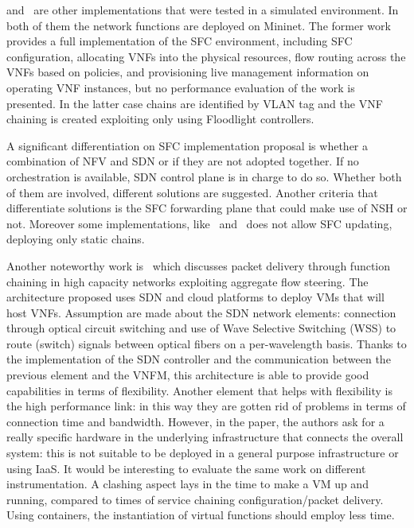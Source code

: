 \cite{csoma2014escape} and~\cite{kim2016evaluations} are other implementations
that were tested in a simulated environment. In both of them the
network functions are deployed on Mininet. The former work provides a full
implementation of the SFC environment, including SFC configuration, allocating
VNFs into the physical resources, flow routing across the VNFs based on
policies, and provisioning live management information on operating VNF
instances, but no performance evaluation of the work is presented. In the latter
case chains are identified by VLAN tag and the VNF chaining is created
exploiting only using Floodlight controllers.

A significant differentiation on SFC implementation proposal is whether a
combination of NFV and SDN or if they are not adopted together. If no
orchestration is available, SDN control plane is in charge to do so. Whether
both of them are involved, different solutions are suggested. Another criteria
that differentiate solutions is the SFC forwarding plane that could make use of
NSH or not. Moreover some implementations, like~\cite{soares2015toward}
and~\cite{abujoda2015midas} does not allow SFC updating, deploying only static
chains.

Another noteworthy work is~\cite{xia2015optical} which discusses packet
delivery through function chaining in high capacity networks exploiting
aggregate flow steering. The architecture proposed uses SDN and cloud
platforms to deploy VMs that will host VNFs. Assumption are made about the SDN
network elements: connection through optical circuit switching and use of Wave
Selective Switching (WSS) to route (switch) signals between optical fibers on a
per-wavelength basis. Thanks to the implementation of the SDN controller and the
communication between the previous element and the VNFM, this architecture is
able to provide good capabilities in terms of flexibility. Another element that
helps with flexibility is the high performance link: in this way they are gotten
rid of problems in terms of connection time and bandwidth. However, in the
paper, the  authors ask for a really specific hardware in the underlying
infrastructure that connects the overall system: this is not suitable to be
deployed in a general purpose infrastructure or using IaaS. It would be
interesting to evaluate the same work on different instrumentation. A clashing
aspect lays in the time to make a VM up and running, compared to times of
service chaining configuration/packet delivery. Using containers, the
instantiation of virtual functions should employ less time.

